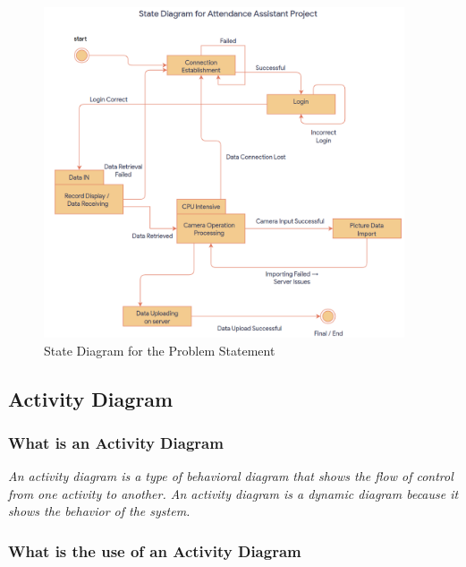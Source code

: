 \documentclass[11pt]{article}
\begin{document}
\begin{figure}[H]
	\centering
	\includegraphics[width=0.95\textwidth]{state.png}
	\caption{State Diagram for the Problem Statement}
	\label{fig:state_diagram_problem_statement}
\end{figure}

\clearpage

\subsection{Activity Diagram}

\subsubsection{What is an Activity Diagram}

\textit{An activity diagram is a type of behavioral diagram that shows the flow of control from one activity to another. An activity diagram is a dynamic diagram because it shows the behavior of the system.}

\subsubsection{What is the use of an Activity Diagram}
\end{document}
